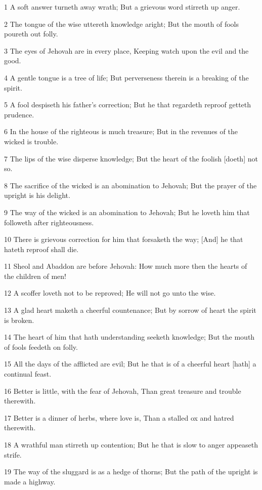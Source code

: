 \par 1 A soft answer turneth away wrath; But a grievous word stirreth up anger.
\par 2 The tongue of the wise uttereth knowledge aright; But the mouth of fools poureth out folly.
\par 3 The eyes of Jehovah are in every place, Keeping watch upon the evil and the good.
\par 4 A gentle tongue is a tree of life; But perverseness therein is a breaking of the spirit.
\par 5 A fool despiseth his father's correction; But he that regardeth reproof getteth prudence.
\par 6 In the house of the righteous is much treasure; But in the revenues of the wicked is trouble.
\par 7 The lips of the wise disperse knowledge; But the heart of the foolish [doeth] not so.
\par 8 The sacrifice of the wicked is an abomination to Jehovah; But the prayer of the upright is his delight.
\par 9 The way of the wicked is an abomination to Jehovah; But he loveth him that followeth after righteousness.
\par 10 There is grievous correction for him that forsaketh the way; [And] he that hateth reproof shall die.
\par 11 Sheol and Abaddon are before Jehovah: How much more then the hearts of the children of men!
\par 12 A scoffer loveth not to be reproved; He will not go unto the wise.
\par 13 A glad heart maketh a cheerful countenance; But by sorrow of heart the spirit is broken.
\par 14 The heart of him that hath understanding seeketh knowledge; But the mouth of fools feedeth on folly.
\par 15 All the days of the afflicted are evil; But he that is of a cheerful heart [hath] a continual feast.
\par 16 Better is little, with the fear of Jehovah, Than great treasure and trouble therewith.
\par 17 Better is a dinner of herbs, where love is, Than a stalled ox and hatred therewith.
\par 18 A wrathful man stirreth up contention; But he that is slow to anger appeaseth strife.
\par 19 The way of the sluggard is as a hedge of thorns; But the path of the upright is made a highway.
